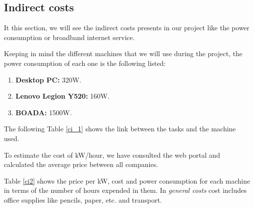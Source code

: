 \documentclass[titlepage,12pt]{report}
\begin{document}
\subsection{Indirect costs}

It this section, we will see the indirect costs presents in our project like the power consumption or broadband internet service.

Keeping in mind the different machines that we will use during the project, the power consumption of each one is the following listed:

\begin{enumerate}
	\item \textbf{Desktop PC:} 320W.
	\item \textbf{Lenovo Legion Y520:} 160W.
	\item \textbf{BOADA:} 1500W.
\end{enumerate}

The following Table \ref{ci_1} shows the link between the tasks and the machine used.

\begin{table}[H]
	\centering
	\caption{Hours per task and machine}
	\label{ci_1}
\end{table}

To estimate the cost of kW/hour, we have consulted the web portal \citep{tuLuz} and calculated the average price between all companies.

Table \ref{ci2} shows the price per kW, cost and power consumption for each machine in terms of the number of hours expended in them. In \textit{general costs} cost includes office supplies like pencils, paper, etc. and transport.
\end{document}
